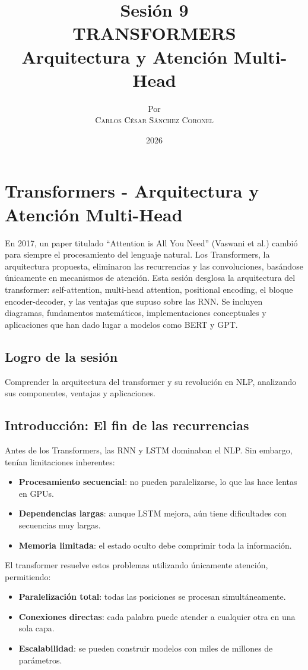 \documentclass[12pt,a4paper,openany,oneside]{book}
\title{
    \textbf{Sesión 9} \\ 
    \Huge \textbf{TRANSFORMERS} \\
    \Large Arquitectura y Atención Multi-Head
}
\author{
    \small Por \\ \vspace{0.2cm}
    \Large \textsc{Carlos César Sánchez Coronel}
}
\date{2026}
\begin{document}
\maketitle
\tableofcontents
{}

\chapter{Transformers - Arquitectura y Atención Multi-Head}

En 2017, un paper titulado ``Attention is All You Need'' (Vaswani et al.) cambió para siempre el procesamiento del lenguaje natural. Los Transformers, la arquitectura propuesta, eliminaron las recurrencias y las convoluciones, basándose únicamente en mecanismos de atención. Esta sesión desglosa la arquitectura del transformer: self-attention, multi-head attention, positional encoding, el bloque encoder-decoder, y las ventajas que supuso sobre las RNN. Se incluyen diagramas, fundamentos matemáticos, implementaciones conceptuales y aplicaciones que han dado lugar a modelos como BERT y GPT.

\section{Logro de la sesión}
Comprender la arquitectura del transformer y su revolución en NLP, analizando sus componentes, ventajas y aplicaciones.

\section{Introducción: El fin de las recurrencias}
Antes de los Transformers, las RNN y LSTM dominaban el NLP. Sin embargo, tenían limitaciones inherentes:
\begin{itemize}
    \item \textbf{Procesamiento secuencial}: no pueden paralelizarse, lo que las hace lentas en GPUs.
    \item \textbf{Dependencias largas}: aunque LSTM mejora, aún tiene dificultades con secuencias muy largas.
    \item \textbf{Memoria limitada}: el estado oculto debe comprimir toda la información.
\end{itemize}

El transformer resuelve estos problemas utilizando únicamente atención, permitiendo:
\begin{itemize}
    \item \textbf{Paralelización total}: todas las posiciones se procesan simultáneamente.
    \item \textbf{Conexiones directas}: cada palabra puede atender a cualquier otra en una sola capa.
    \item \textbf{Escalabilidad}: se pueden construir modelos con miles de millones de parámetros.
\end{itemize}
\end{document}

